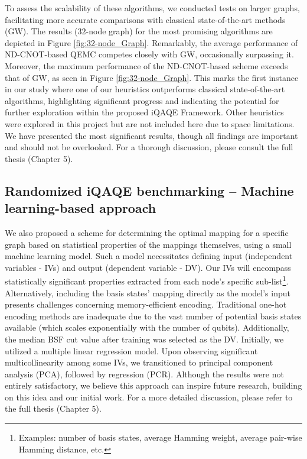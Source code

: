 To assess the scalability of these algorithms, we conducted tests on larger graphs, facilitating more accurate comparisons with classical state-of-the-art methods (GW). The results ($32$-node graph) for the most promising algorithms are depicted in Figure \ref{fig:32-node_Graph}. Remarkably, the average performance of ND-CNOT-based QEMC competes closely with GW, occasionally surpassing it. Moreover, the maximum performance of the ND-CNOT-based scheme exceeds that of GW, as seen in Figure \ref{fig:32-node_Graph}. This marks the first instance in our study where one of our heuristics outperforms classical state-of-the-art algorithms, highlighting significant progress and indicating the potential for further exploration within the proposed iQAQE Framework. Other heuristics were explored in this project but are not included here due to space limitations. We have presented the most significant results, though all findings are important and should not be overlooked. For a thorough discussion, please consult the full thesis (Chapter 5).

\subsection{Randomized iQAQE benchmarking -- Machine learning-based approach}
\label{subsection:Randomized_iQAQE_ML}
We also proposed a scheme for determining the optimal mapping for a specific graph based on statistical properties of the mappings themselves, using a small machine learning model. Such a model necessitates defining input (independent variables - IVs) and output (dependent variable - DV). Our IVs will encompass statistically significant properties extracted from each node's specific sub-list\footnote{Examples: number of basis states, average Hamming weight, average pair-wise Hamming distance, etc.}. Alternatively, including the basis states' mapping directly as the model's input presents challenges concerning memory-efficient encoding. Traditional one-hot encoding methods are inadequate due to the vast number of potential basis states available (which scales exponentially with the number of qubits). Additionally, the median BSF cut value after training was selected as the DV. Initially, we utilized a multiple linear regression model. Upon observing significant multicollinearity among some IVs, we transitioned to principal component analysis (PCA), followed by regression (PCR). Although the results were not entirely satisfactory, we believe this approach can inspire future research, building on this idea and our initial work. For a more detailed discussion, please refer to the full thesis (Chapter 5).